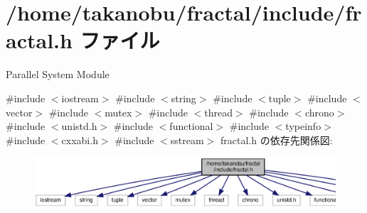 \section{/home/takanobu/fractal/include/fractal.h ファイル}
\label{fractal_8h}


Parallel System Module  


{\ttfamily \#include $<$iostream$>$}\newline
{\ttfamily \#include $<$string$>$}\newline
{\ttfamily \#include $<$tuple$>$}\newline
{\ttfamily \#include $<$vector$>$}\newline
{\ttfamily \#include $<$mutex$>$}\newline
{\ttfamily \#include $<$thread$>$}\newline
{\ttfamily \#include $<$chrono$>$}\newline
{\ttfamily \#include $<$unistd.\+h$>$}\newline
{\ttfamily \#include $<$functional$>$}\newline
{\ttfamily \#include $<$typeinfo$>$}\newline
{\ttfamily \#include $<$cxxabi.\+h$>$}\newline
{\ttfamily \#include $<$sstream$>$}\newline
fractal.\+h の依存先関係図\+:
\nopagebreak
\begin{figure}[H]
\begin{center}
\leavevmode
\includegraphics[width=350pt]{fractal_8h__incl}
\end{center}
\end{figure}
